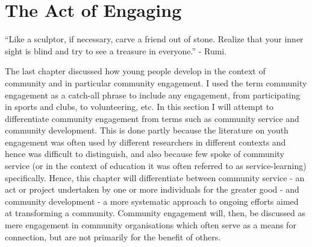 \chapter{The Act of Engaging}

\begin{bclogo}[couleur=blue!30, arrondi=0.2, logo=\bclampe]{“Like a sculptor, if necessary, carve a friend out of stone. Realize that your inner sight is blind and try to see a treasure in everyone.” }
	- Rumi.	
\end{bclogo}


\label{YP&CB}

The last chapter discussed how young people develop in the context of community and in particular community engagement. I used the term community engagement as a catch-all phrase to include any engagement, from participating in sports and clubs, to volunteering, etc. In this section I will attempt to differentiate community engagement from terms such as community service and community development. This is done partly because the literature on youth engagement was often used by different researchers in different contexts and hence was difficult to distinguish, and also because few spoke of community service (or in the context of education it was often referred to as service-learning) specifically. Hence, this chapter will differentiate between community service - an act or project undertaken by one or more individuals for the greater good - and community development - a more systematic approach to ongoing efforts aimed at transforming a community. Community engagement will, then, be discussed as mere engagement in community organisations which often serve as a means for connection, but are not primarily for the benefit of others.

